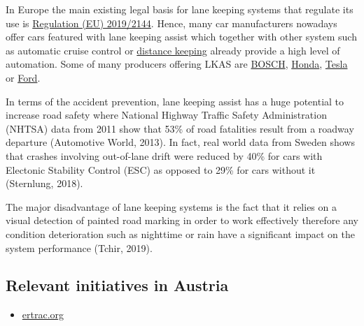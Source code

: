 \documentclass[
]{book}
\providecommand{\tightlist}{%
  \setlength{\itemsep}{0pt}\setlength{\parskip}{0pt}}
\begin{document}
In Europe the main existing legal basis for lane keeping systems that regulate its use is \href{https://op.europa.eu/en/publication-detail/-/publication/bfd5eba8-2058-11ea-95ab-01aa75ed71a1/language-en}{Regulation (EU) 2019/2144}. Hence, many car manufacturers nowadays offer cars featured with lane keeping assist which together with other system such as automatic cruise control or \protect\hyperlink{distance_keeping}{distance keeping} already provide a high level of automation. Some of many producers offering LKAS are \href{https://www.bosch-mobility-solutions.com/en/products-and-services/passenger-cars-and-light-commercial-vehicles/driver-assistance-systems/lane-keeping-assist/}{BOSCH}, \href{https://www.hondainfocenter.com/2021/CR-V/Feature-Guide/Interior-Features/Lane-Keeping-Assist-System-LKAS/}{Honda}, \href{https://www.tesla.com/de_DE/blog/more-advanced-safety-tesla-owners?redirect=no}{Tesla} or \href{https://owner.ford.com/support/how-tos/safety/driver-assist-technology/driving/how-to-use-lane-keeping-system.html}{Ford}.

In terms of the accident prevention, lane keeping assist has a huge potential to increase road safety where National Highway Traffic Safety Administration (NHTSA) data from 2011 show that 53\% of road fatalities result from a roadway departure (Automotive World, 2013). In fact, real world data from Sweden shows that crashes involving out-of-lane drift were reduced by 40\% for cars with Electonic Stability Control (ESC) as opposed to 29\% for cars without it (Sternlung, 2018).

The major disadvantage of lane keeping systems is the fact that it relies on a visual detection of painted road marking in order to work effectively therefore any condition deterioration such as nighttime or rain have a significant impact on the system performance (Tchir, 2019).

\hypertarget{relevant-initiatives-in-austria-19}{%
\subsection*{Relevant initiatives in Austria}\label{relevant-initiatives-in-austria-19}}

\begin{itemize}
\tightlist
\item
  \href{https://www.ertrac.org/uploads/images/ERTRAC2019-Connected-Automated-Driving-Roadmap\%20-2019-04-04.pdf}{ertrac.org}
\end{itemize}
\end{document}
